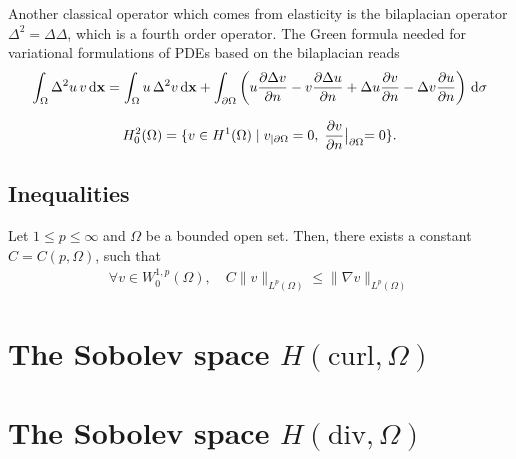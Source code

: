 Another classical operator which comes from elasticity is the bilaplacian operator $\Delta^2 = \Delta \Delta$, which is a fourth order operator. The Green formula needed for variational formulations of PDEs based on the bilaplacian reads
\begin{equation}\label{eq:greenbilap}
\int_\Omega \Delta^2 u\, v \,{\rm d} \mathbf{x} = \int_\Omega u\,  \Delta^2 v \,{\rm d} \mathbf{x}
+ \int_{\partial\Omega} \left(   u \frac{\partial \Delta v}{\partial n} - v \frac{\partial \Delta u}{\partial n} + \Delta u \frac{\partial v}{\partial n} -\Delta v \frac{\partial u}{\partial n}  \right)\,{\rm d}\sigma 
\end{equation}

$$H^2_0(\Omega) = \{ v \in H^1(\Omega) \;|\; v_{|\partial\Omega} =0, \; \frac{\partial v}{\partial n}\bigl|_{\partial\Omega}=0 \}.$$

\subsection{Inequalities}
\begin{lemma}[Poincar\'e]
  Let $1 \leq p \leq \infty$ and $\Omega$ be a bounded open set. Then, there exists a constant $C=C(p, \Omega)$, such that
  \begin{align}
    \forall v \in W_0^{1,p}(\Omega), \quad C \| v \|_{L^p(\Omega)} \leq  \| \nabla v \|_{L^p(\Omega)} 
    \label{eq:poincare-inequality}
  \end{align}
\end{lemma}



\section{The Sobolev space $ H(\textrm{curl}, \Omega)$}


\section{The Sobolev space $ H(\textrm{div}, \Omega)$}


